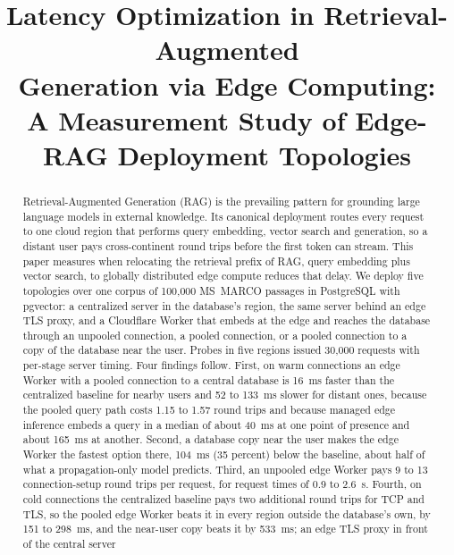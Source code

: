 \documentclass[conference]{IEEEtran}
\begin{document}
\title{Latency Optimization in Retrieval-Augmented\\ Generation via Edge Computing:\\ A Measurement Study of Edge-RAG Deployment Topologies}

\author{
}

\maketitle

\begin{abstract}
Retrieval-Augmented Generation (RAG) is the prevailing pattern for grounding large language
models in external knowledge. Its canonical deployment routes every request to one cloud region
that performs query embedding, vector search and generation, so a distant user pays
cross-continent round trips before the first token can stream. This paper measures when relocating
the retrieval prefix of RAG, query embedding plus vector search, to globally distributed edge
compute reduces that delay. We deploy five topologies over one corpus of 100{,}000 MS~MARCO
passages in PostgreSQL with pgvector: a centralized server in the database's region, the same
server behind an edge TLS proxy, and a Cloudflare Worker that embeds at the edge and reaches the
database through an unpooled connection, a pooled connection, or a pooled connection to a copy of
the database near the user. Probes in five regions issued 30{,}000 requests with per-stage server
timing. Four findings follow. First, on warm connections an edge Worker with a pooled connection to
a central database is 16~ms faster than the centralized baseline for nearby users and 52 to 133~ms
slower for distant ones, because the pooled query path costs 1.15 to 1.57 round trips and because
managed edge inference embeds a query in a median of about 40~ms at one point of presence and
about 165~ms at another. Second, a database copy near the user makes the edge Worker the fastest
option there, 104~ms (35 percent) below the baseline, about half of what a propagation-only model
predicts. Third, an unpooled edge Worker pays 9 to 13 connection-setup round trips per request,
for request times of 0.9 to 2.6~s. Fourth, on cold connections the centralized baseline pays two additional round trips
for TCP and TLS, so the pooled edge Worker beats it in every region outside the database's own, by
151 to 298~ms, and the near-user copy beats it by 533~ms; an edge TLS proxy in front of the central server

\end{abstract}
\end{document}
